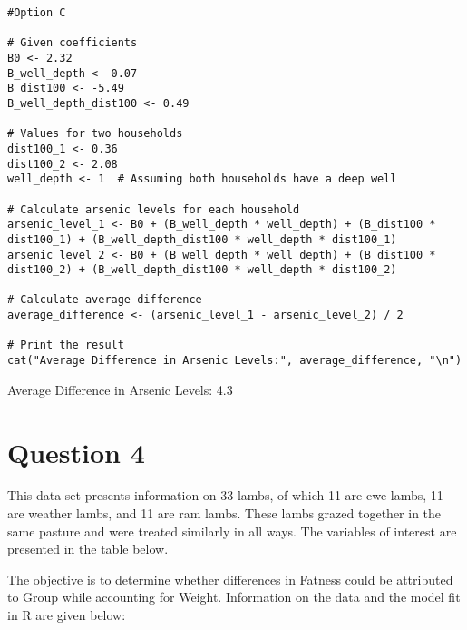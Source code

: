 \documentclass[12pt,letterpaper]{article}
\begin{document}
\begin{enumerate}
	\begin{lstlisting}
#Option C

# Given coefficients
B0 <- 2.32
B_well_depth <- 0.07
B_dist100 <- -5.49
B_well_depth_dist100 <- 0.49

# Values for two households
dist100_1 <- 0.36 
dist100_2 <- 2.08 
well_depth <- 1  # Assuming both households have a deep well

# Calculate arsenic levels for each household
arsenic_level_1 <- B0 + (B_well_depth * well_depth) + (B_dist100 * dist100_1) + (B_well_depth_dist100 * well_depth * dist100_1)
arsenic_level_2 <- B0 + (B_well_depth * well_depth) + (B_dist100 * dist100_2) + (B_well_depth_dist100 * well_depth * dist100_2)

# Calculate average difference
average_difference <- (arsenic_level_1 - arsenic_level_2) / 2

# Print the result
cat("Average Difference in Arsenic Levels:", average_difference, "\n")
	\end{lstlisting}

	Average Difference in Arsenic Levels: 4.3

\end{enumerate}

\newpage

\section*{Question 4}
\vspace{.25cm}
\noindent This data set presents information on 33 lambs, of which 11 are ewe lambs, 11 are weather lambs, and 11 are ram lambs. These lambs grazed together in the same pasture and were treated similarly in all ways. The variables of interest are presented in the table below.

The objective is to determine whether differences in Fatness could be attributed to Group while accounting for Weight. Information on the data and the model fit in R are given below:
\end{document}
